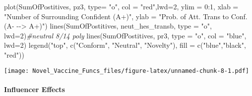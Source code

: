 \documentclass[
]{article}
\newenvironment{Shaded}{\begin{snugshade}}{\end{snugshade}}
\newcommand{\AttributeTok}[1]{\textcolor[rgb]{0.77,0.63,0.00}{#1}}
\newcommand{\CommentTok}[1]{\textcolor[rgb]{0.56,0.35,0.01}{\textit{#1}}}
\newcommand{\DecValTok}[1]{\textcolor[rgb]{0.00,0.00,0.81}{#1}}
\newcommand{\FunctionTok}[1]{\textcolor[rgb]{0.00,0.00,0.00}{#1}}
\newcommand{\NormalTok}[1]{#1}
\newcommand{\SpecialCharTok}[1]{\textcolor[rgb]{0.00,0.00,0.00}{#1}}
\newcommand{\StringTok}[1]{\textcolor[rgb]{0.31,0.60,0.02}{#1}}
\begin{document}
\begin{Shaded}
\begin{Highlighting}[]
\FunctionTok{plot}\NormalTok{(SumOfPostitives, pz3, }\AttributeTok{type=} \StringTok{"o"}\NormalTok{, }\AttributeTok{col =} \StringTok{"red"}\NormalTok{,}\AttributeTok{lwd=}\DecValTok{2}\NormalTok{, }\AttributeTok{ylim =} \DecValTok{0}\SpecialCharTok{:}\DecValTok{1}\NormalTok{, }\AttributeTok{xlab =} \StringTok{"Number of Surrounding Confident (A+)"}\NormalTok{, }\AttributeTok{ylab =} \StringTok{"Prob. of Att. Trans to Conf. (A{-} {-}{-}\textgreater{} A+)"}\NormalTok{)}
\FunctionTok{lines}\NormalTok{(SumOfPostitives, neut\_hes\_transb, }\AttributeTok{type =} \StringTok{"o"}\NormalTok{, }\AttributeTok{lwd=}\DecValTok{2}\NormalTok{)}\CommentTok{\#neutral 8/14 poly}
\FunctionTok{lines}\NormalTok{(SumOfPostitives, pr3, }\AttributeTok{type =} \StringTok{"o"}\NormalTok{, }\AttributeTok{col =} \StringTok{"blue"}\NormalTok{, }\AttributeTok{lwd=}\DecValTok{2}\NormalTok{)}
\FunctionTok{legend}\NormalTok{(}\StringTok{"top"}\NormalTok{, }\FunctionTok{c}\NormalTok{(}\StringTok{"Conform"}\NormalTok{, }\StringTok{"Neutral"}\NormalTok{, }\StringTok{"Novelty"}\NormalTok{), }\AttributeTok{fill =} \FunctionTok{c}\NormalTok{(}\StringTok{"blue"}\NormalTok{,}\StringTok{"black"}\NormalTok{, }\StringTok{"red"}\NormalTok{))}
\end{Highlighting}
\end{Shaded}

\texttt{[image: Novel\_Vaccine\_Funcs\_files/figure-latex/unnamed-chunk-8-1.pdf]}

\hypertarget{influencer-effects}{%
\paragraph{Influencer Effects}\label{influencer-effects}}
\end{document}

